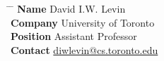 \documentclass[10pt]{article} %
\begin{document}
\parbox{0.5\textwidth}{
\begin{tabbing}
\hspace{2.75cm} \= \hspace{4cm} \= \kill
{\bf Name} \> David I.W. Levin\\ 
{\bf Company} \> University of Toronto\\ 
{\bf Position} \>Assistant Professor \\ 
{\bf Contact} \> \href{mailto:diwlevin@cs.toronto.edu}{diwlevin@cs.toronto.edu}
\end{tabbing}}


\end{document}
